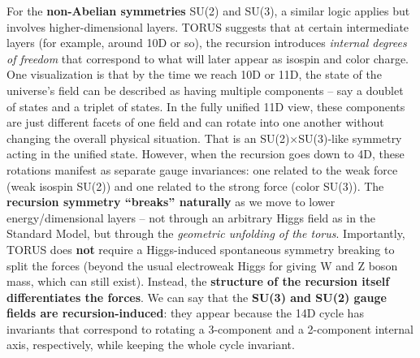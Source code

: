 \documentclass[
]{article}
\begin{document}
{For the \textbf{non-Abelian symmetries} SU(2) and SU(3), a similar logic
applies but involves higher-dimensional layers. TORUS suggests that at
certain intermediate layers (for example, around 10D or so), the
recursion introduces \emph{internal degrees of freedom} that correspond
to what will later appear as isospin and color charge\hspace{0pt}. One
visualization is that by the time we reach 10D or 11D, the state of the
universe's field can be described as having multiple components -- say a
doublet of states and a triplet of states. In the fully unified 11D
view, these components are just different facets of one field and can
rotate into one another without changing the overall physical situation.
That is an SU(2)×SU(3)-like symmetry acting in the unified state.
However, when the recursion goes down to 4D, these rotations manifest as
separate gauge invariances: one related to the weak force (weak isospin
SU(2)) and one related to the strong force (color SU(3)). The
\textbf{recursion symmetry ``breaks'' naturally} as we move to lower
energy/dimensional layers -- not through an arbitrary Higgs field as in
the Standard Model, but through the \emph{geometric unfolding of the
torus}. Importantly, TORUS does \textbf{not} require a Higgs-induced
spontaneous symmetry breaking to split the forces (beyond the usual
electroweak Higgs for giving W and Z boson mass, which can still exist).
Instead, the \textbf{structure of the recursion itself differentiates
the forces}\hspace{0pt}. We can say that the \textbf{SU(3) and SU(2)
gauge fields are recursion-induced}: they appear because the 14D cycle
has invariants that correspond to rotating a 3-component and a
2-component internal axis, respectively, while keeping the whole cycle
invariant.

}
\end{document}

